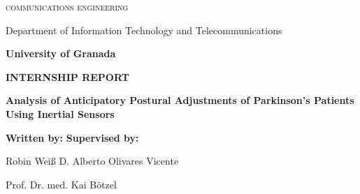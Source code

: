 \begin{titlepage}
\label{ch:titlepage}
\begin{center}

{\Large\textsc{communications engineering}}

Department of Information Technology and Telecommunications

\textbf{University of Granada}

\vspace{0.5cm}

\begin{figure}[h]
	\centering
	\label{fig:ugr}
\end{figure}

\vspace{0.5cm}
\textbf{INTERNSHIP REPORT}

\vspace{0.9cm}

{\Huge\textbf{Analysis of Anticipatory Postural Adjustments of Parkinson's Patients Using Inertial Sensors}}

\end{center}

\vspace{1.5cm}
\textbf{Written by:}  \hfill \textbf{Supervised by:}

Robin Weiß \hfill D. Alberto Olivares Vicente

\hfill Prof. Dr. med. Kai B\"{o}tzel

\end{titlepage}
